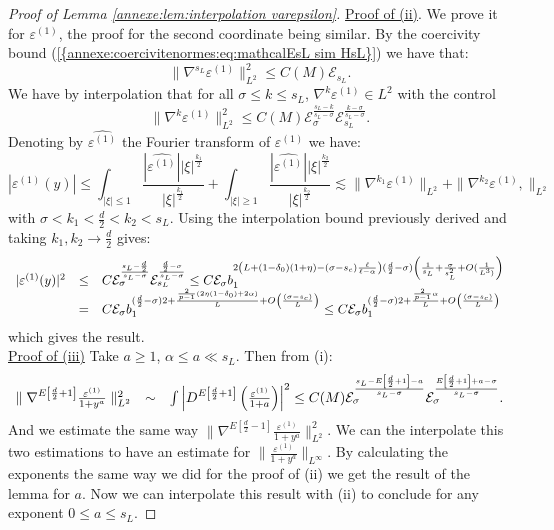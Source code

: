 \documentclass[11pt,a4paper,reqno]{amsart}
\theoremstyle{remark}
\numberwithin{equation}{section}
\begin{document}
\begin{appendix}
\begin{proof}[Proof of Lemma \ref{annexe:lem:interpolation varepsilon}]
\underline{Proof of (ii)}. We prove it for $\varepsilon^{(1)}$, the proof for the second coordinate being similar. By the coercivity bound {{\rm (\ref{{annexe:coercivitenormes:eq:mathcalEsL sim HsL}})}} we have that:
$$
\parallel \nabla^{s_L} \varepsilon^{(1)} \parallel_{L^2}^2 \leq C(M) \mathcal{E}_{s_L} .
$$
We have by interpolation that for all $\sigma \leq k \leq s_L$, $\nabla^{k}\varepsilon^{(1)}\in L^2$ with the control
$$
\parallel \nabla^{k}\varepsilon^{(1)} \parallel_{L^2}^2 \leq C(M) \mathcal{E}_{\sigma}^{\frac{s_L-k}{s_L-\sigma}} \mathcal{E}_{s_L}^{\frac{k-\sigma}{s_L-\sigma}} .
$$ 
Denoting by $\hat{\varepsilon^{(1)}}$ the Fourier transform of $\varepsilon^{(1)}$ we have:
$$
|\varepsilon^{(1)}(y)|\leq \int_{|\xi|\leq 1} \frac{|\hat{\varepsilon^{(1)}}||\xi|^{\frac{k_1}{2}}}{|\xi|^{\frac{k_1}{2}}}+\int_{|\xi|\geq 1} \frac{|\hat{\varepsilon^{(1)}}||\xi|^{\frac{k_2}{2}}}{|\xi|^{\frac{k_2}{2}}} \lesssim \parallel \nabla^{k_1}\varepsilon^{(1)} \parallel_{L^2} +\parallel \nabla^{k_2}\varepsilon^{(1)} ,\parallel_{L^{2}}
$$
with $\sigma<k_1<\frac{d}{2}<k_2<s_L$. Using the interpolation bound previously derived and taking $k_1,k_2\rightarrow\frac{d}{2}$ gives:
$$
\begin{array}{ r c l}
|\varepsilon^{(1)}(y)|^2&\leq& C\mathcal{E}_{\sigma}^{\frac{s_L-\frac{d}{2}}{s_L-\sigma}} \mathcal{E}_{s_L}^{\frac{\frac{d}{2}-\sigma}{s_L-\sigma}} \leq C\mathcal{E}_{\sigma} b_1^{2\left(L+(1-\delta_0)(1+\eta)-(\sigma-s_c)\frac{\ell}{\ell-\alpha}\right)(\frac{d}{2}-\sigma)\left( \frac{1}{s_L}+\frac{\sigma}{s_L^2}+O(\frac{1}{L^3)}\right)} \\
&=& C\mathcal{E}_{\sigma} b_1^{(\frac{d}{2}-\sigma)2+\frac{\frac{2}{p-1}(2\eta(1-\delta_0)+2\alpha)}{L}+O\left(\frac{(\sigma-s_c)}{L} \right)}\leq  C\mathcal{E}_{\sigma} b_1^{(\frac{d}{2}-\sigma)2+\frac{\frac{2}{p-1}\alpha}{L}+O\left(\frac{(\sigma-s_c)}{L} \right)}
\end{array}
$$
which gives the result.\\

\underline{Proof of (iii)} Take $a\geq 1$, $\alpha\leq a\ll s_L$. Then from (i):
$$
\begin{array}{r c l}
\parallel\nabla^{E\left[\frac{d}{2}+1 \right]}\frac{\varepsilon^{(1)}}{1+y^{a}}\parallel_{L^2}^2 &\sim& \int \left|D^{E\left[\frac{d}{2}+1 \right]}\left(\frac{\varepsilon^{(1)}}{1+{a}} \right)\right|^2 \leq  C(M)\mathcal{E}_{\sigma}^{\frac{s_L-E\left[\frac{d}{2}+1 \right]-a}{s_L-\sigma}} \mathcal{E}_{\sigma}^{\frac{E\left[\frac{d}{2}+1 \right]+a-\sigma}{s_L-\sigma}} .
\end{array}
$$
And we estimate the same way $\parallel \nabla^{E\left[\frac{d}{2}-1 \right]}\frac{\varepsilon^{(1)}}{1+y^{a}} \parallel_{L^2}^2$. We can the interpolate this two estimations to have an estimate for $\parallel \frac{\varepsilon^{(1)}}{1+y^{a}} \parallel_{L^{\infty}}$. By calculating the exponents the same way we did for the proof of (ii) we get the result of the lemma for $a$. Now we can interpolate this result with (ii) to conclude for any exponent $0\leq a \leq s_L$.
\end{proof}

\end{appendix}
\end{document}
